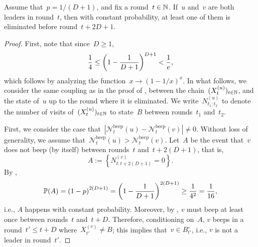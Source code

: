 \documentclass{article}
\newcommand{\nlead}{\circ}
\newcommand{\beepcount}{\mathcal{N}^{\mathrm{beep}}}
\begin{document}
\begin{lemma} \label{lemma:elimination}
    Assume that~$p = 1/(D+1)$, and fix a round~$t \in \operatorname{\mathbb{N}}$.
    If~$u$ and~$v$ are both leaders in round~$t$, then with constant probability, at least one of them is eliminated before round~$t+2D+1$.
\end{lemma}
\begin{proof}
    First, note that since~$D \geq 1$,
    \begin{equation} \label{eq:simple_bounds}
        \frac{1}{4} \leq \left( 1-\frac{1}{D+1} \right)^{D+1} < \frac{1}{e},
    \end{equation}
    which follows by analyzing the function~$x \rightarrow (1-1/x)^x$.
    In what follows, 
    we consider the same coupling as in the proof of , between the chain~$(X_t^{(u)})_{t \in \operatorname{\mathbb{N}}}$, and the state of~$u$ up to the round where it is eliminated.
    We write~$N_{t_1:t_2}^{(u)}$ to denote the number of visits of~$(X_t^{(u)})_{t \in \operatorname{\mathbb{N}}}$ to state~$B$ between rounds~$t_1$ and~$t_2$.

    First, we consider the case that~$|\beepcount_t(u) - \beepcount_t(v)| \neq 0$. 
    Without loss of generality, we assume that~$\beepcount_t(u) > \beepcount_t(v)$. Let~$A$ be the event that~$v$ does not beep (by itself) between rounds~$t$ and~$t+2(D+1)$, that is,
    \begin{equation*}
        A := \left\{ N_{t:t+2(D+1)}^{(v)} = 0 \right\}.
    \end{equation*}
    By ,
    \begin{equation*}
        \operatorname{\mathbb{P}}(A) = \left( 1-p \right)^{2(D+1)} = \left( 1-\frac{1}{D+1} \right)^{2(D+1)} \geq \frac{1}{4^2} = \frac{1}{16},
    \end{equation*}
    i.e., $A$ happens with constant probability.
    Moreover, by , $v$ must beep at least once between rounds~$t$ and~$t+D$. Therefore, conditioning on~$A$, $v$ beeps in a round~$t' \leq t+D$ where~$X_{t'}^{(v)} \neq B$; this implies that~$v \in B^\nlead_{t'}$, i.e., $v$ is not a leader in round~$t'$.
    

\end{proof}
\end{document}
